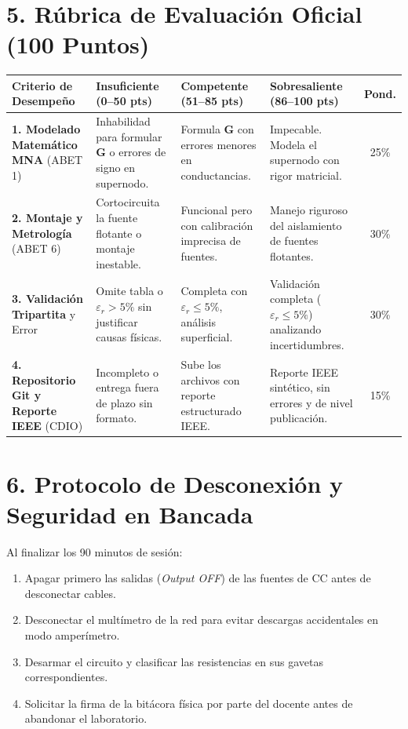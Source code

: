 \documentclass[11pt, a4paper]{article}
\begin{document}
\section{5. Rúbrica de Evaluación Oficial (100 Puntos)}
\begin{table}[H]
    \centering
    \footnotesize
    \renewcommand{\arraystretch}{1.5}
    \begin{tabularx}{\textwidth}{@{}p{3.5cm} >{\raggedright\arraybackslash}X >{\raggedright\arraybackslash}X >{\raggedright\arraybackslash}X c@{}}
        \toprule
        \rowcolor{ucbblue!10}
        \textbf{Criterio de Desempeño} & \textbf{Insuficiente (0--50 pts)} & \textbf{Competente (51--85 pts)} & \textbf{Sobresaliente (86--100 pts)} & \textbf{Pond.} \\
        \midrule
        \textbf{1. Modelado Matemático MNA} (ABET 1) & Inhabilidad para formular $\mathbf{G}$ o errores de signo en supernodo. & Formula $\mathbf{G}$ con errores menores en conductancias. & Impecable. Modela el supernodo con rigor matricial. & 25\% \\
        \textbf{2. Montaje y Metrología} (ABET 6) & Cortocircuita la fuente flotante o montaje inestable. & Funcional pero con calibración imprecisa de fuentes. & Manejo riguroso del aislamiento de fuentes flotantes. & 30\% \\
        \textbf{3. Validación Tripartita} y Error & Omite tabla o $\varepsilon_r > 5\%$ sin justificar causas físicas. & Completa con $\varepsilon_r \le 5\%$, análisis superficial. & Validación completa ($\varepsilon_r \le 5\%$) analizando incertidumbres. & 30\% \\
        \textbf{4. Repositorio Git y Reporte IEEE} (CDIO) & Incompleto o entrega fuera de plazo sin formato. & Sube los archivos con reporte estructurado IEEE. & Reporte IEEE sintético, sin errores y de nivel publicación. & 15\% \\
        \bottomrule
    \end{tabularx}
\end{table}

\section{6. Protocolo de Desconexión y Seguridad en Bancada}
Al finalizar los 90 minutos de sesión:
\begin{enumerate}
    \item Apagar primero las salidas (\textit{Output OFF}) de las fuentes de CC antes de desconectar cables.
    \item Desconectar el multímetro de la red para evitar descargas accidentales en modo amperímetro.
    \item Desarmar el circuito y clasificar las resistencias en sus gavetas correspondientes.
    \item Solicitar la firma de la bitácora física por parte del docente antes de abandonar el laboratorio.
\end{enumerate}
\end{document}
